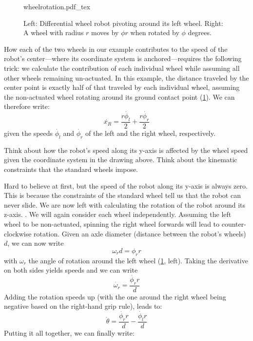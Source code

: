 \begin{figure}[htb!]
    \centering
    \def\svgwidth{0.86\textwidth}
    {wheelrotation.pdf_tex}
    \caption{Left: Differential wheel robot pivoting around its left wheel. Right: A wheel with radius $r$ moves by $\phi r$ when rotated by $\phi$ degrees.}
    \label{fig:wheelrotation}
\end{figure}



How each of the two wheels in our example contributes to the speed of the robot's center---where its coordinate system is anchored---requires the following trick: we calculate the contribution of each individual wheel while assuming all other wheels remaining un-actuated.
In this example, the distance traveled by the center point is exactly half of that traveled by each individual wheel, assuming the non-actuated wheel rotating around its ground contact point (\cref{fig:wheelrotation}). We can therefore write:
\begin{equation}
\dot{x_R}=\frac{r\dot{\phi_l}}{2}+\frac{r\dot{\phi_r}}{2}
\end{equation}
given the speeds $ \dot{\phi_l}$ and $ \dot{\phi_r}$ of the left and the right wheel, respectively.

\begin{framed}
Think about how the robot's speed along its y-axis is affected by the wheel speed given the coordinate system in the drawing above. Think about the kinematic constraints that the standard wheels impose.
\end{framed}

Hard to believe at first, but the speed of the robot along its y-axis is always zero. This is because the constraints of the standard wheel tell us that the robot can never slide.
We are now left with calculating the rotation of the robot around its z-axis.
.
We will again consider each wheel independently. Assuming the left wheel to be non-actuated, spinning the right wheel forwards will lead to counter-clockwise rotation. Given an axle diameter (distance between the robot's wheels) $d$, we can now write
\begin{equation}
\omega_r d = \phi_r r
\end{equation}
with $\omega_r$ the angle of rotation around the left wheel (\cref{fig:wheelrotation}, left). Taking the derivative on both sides yields speeds and we can write
\begin{equation}
\dot{\omega_r} = \frac{\dot{\phi_r} r}{d}
\end{equation}
Adding the rotation speeds up (with the one around the right wheel being negative based on the right-hand grip rule), leads to:
%
\begin{equation}
\dot{\theta}=\frac{\dot{\phi_r} r}{d}-\frac{\dot{\phi_l} r}{d}
\end{equation}
%
Putting it all together, we can finally write:


